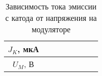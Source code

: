     \begin{table}[h!]
        \center
        \caption{Зависимость тока эмиссии с катода от напряжения на модуляторе}
        \begin{tabular}{|*{8}{C{.08}|}} \hline
            \( J_K \), мкА &&&&&&& \\ \hline
            \( U_M \), В &&&&&&& \\ \hline
        \end{tabular}
    \end{table}

